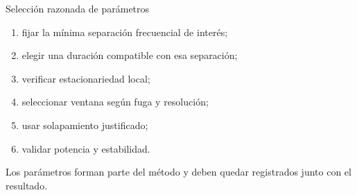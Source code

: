 \documentclass[
  ignorenonframetext,
  aspectratio=169,
  spanish,
]{beamer}
\providecommand{\tightlist}{%
  \setlength{\itemsep}{0pt}\setlength{\parskip}{0pt}}
\begin{document}
\begin{frame}{Selección razonada de parámetros}
  \protect{}\label{selecciuxf3n-razonada-de-paruxe1metros}
  \begin{enumerate}
    \tightlist
    \item
          fijar la mínima separación frecuencial de interés;
    \item
          elegir una duración compatible con esa separación;
    \item
          verificar estacionariedad local;
    \item
          seleccionar ventana según fuga y resolución;
    \item
          usar solapamiento justificado;
    \item
          validar potencia y estabilidad.
  \end{enumerate}

  \begin{tcolorbox}[enhanced jigsaw, arc=.35mm, bottomrule=.15mm, bottomtitle=1mm, breakable, colback=white, colbacktitle=quarto-callout-tip-color!10!white, colframe=quarto-callout-tip-color-frame, coltitle=black, left=2mm, leftrule=.75mm, opacityback=0, opacitybacktitle=0.6, rightrule=.15mm, title=\textcolor{quarto-callout-tip-color}{\faLightbulb}\hspace{0.5em}{Tip}, titlerule=0mm, toprule=.15mm, toptitle=1mm]

    Los parámetros forman parte del método y deben quedar registrados junto
    con el resultado.

  \end{tcolorbox}
\end{frame}
\end{document}
